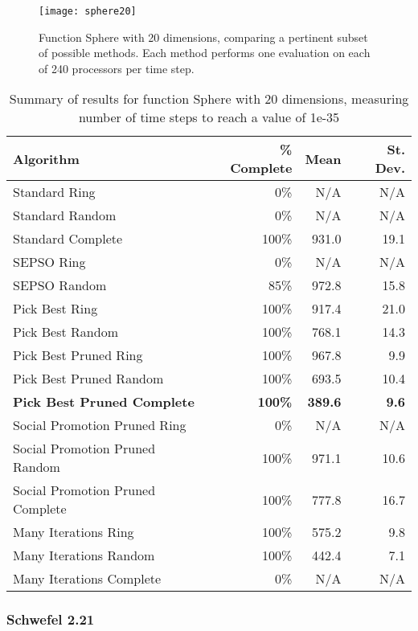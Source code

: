 \documentclass[smallcondensed]{svjour3}
\begin{document}
\begin{figure}
  \centering
  \texttt{[image: sphere20]}
  \caption{Function Sphere with 20 dimensions, comparing a pertinent subset of
  possible methods.  Each method performs one evaluation on each of 240
  processors per time step.}
  \label{fig:sphere-20}
\end{figure}

\begin{table}
  \caption{Summary of results for function Sphere with 20 dimensions,
  measuring number of time steps to reach a value of 1e-35}
  \label{tab:sphere-20}
  \centering
  \begin{tabular}{|l|r|r|r|}
  \hline
  Algorithm&\% Complete&Mean&St. Dev.\\
  \hline
  \hline
  Standard Ring&0\%&N/A&N/A\\
  \hline
  Standard Random&0\%&N/A&N/A\\
  \hline
  Standard Complete&100\%&931.0&19.1\\
  \hline
  SEPSO Ring&0\%&N/A&N/A\\
  \hline
  SEPSO Random&85\%&972.8&15.8\\
  \hline
  Pick Best Ring&100\%&917.4&21.0\\
  \hline
  Pick Best Random&100\%&768.1&14.3\\
  \hline
  Pick Best Pruned Ring&100\%&967.8&9.9\\
  \hline
  Pick Best Pruned Random&100\%&693.5&10.4\\
  \hline
  \textbf{Pick Best Pruned Complete}&\textbf{100\%}&\textbf{389.6}&
    \textbf{9.6}\\
  \hline
  Social Promotion Pruned Ring&0\%&N/A&N/A\\
  \hline
  Social Promotion Pruned Random&100\%&971.1&10.6\\
  \hline
  Social Promotion Pruned Complete&100\%&777.8&16.7\\
  \hline
  Many Iterations Ring&100\%&575.2&9.8\\
  \hline
  Many Iterations Random&100\%&442.4&7.1\\
  \hline
  Many Iterations Complete&0\%&N/A&N/A\\
  \hline
  \end{tabular}
\end{table}


\subsubsection{Schwefel 2.21}
\end{document}
